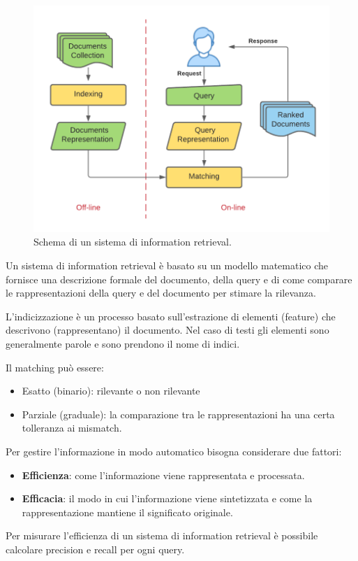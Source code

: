 \begin{figure}[ht]
  \centering
  \includegraphics[width=0.8\linewidth]{images/irsystem.png}
  \caption{Schema di un sistema di information retrieval.}
\end{figure}

Un sistema di information retrieval è basato su un modello matematico che fornisce una descrizione formale del documento, della query e
di come comparare le rappresentazioni della query e del documento per stimare la rilevanza.

L'indicizzazione è un processo basato sull'estrazione di elementi (feature) che descrivono (rappresentano) il documento.
Nel caso di testi gli elementi sono generalmente parole e sono prendono il nome di indici.

Il matching può essere:
\begin{itemize}
  \item Esatto (binario): rilevante o non rilevante
  \item Parziale (graduale): la comparazione tra le rappresentazioni ha una certa tolleranza ai mismatch.
\end{itemize}

Per gestire l'informazione in modo automatico bisogna considerare due fattori:
\begin{itemize}
  \item \textbf{Efficienza}: come l'informazione viene rappresentata e processata.
  \item \textbf{Efficacia}: il modo in cui l'informazione viene sintetizzata e come la rappresentazione mantiene il significato originale.
\end{itemize}

Per misurare l'efficienza di un sistema di information retrieval è possibile calcolare precision e recall per ogni query.

